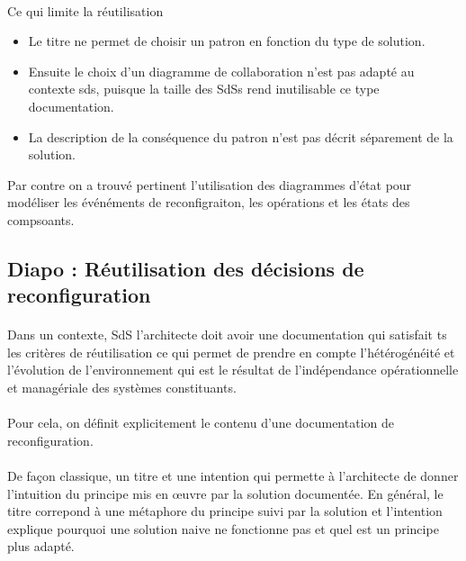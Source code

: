 \paragraph{}
Ce qui limite la réutilisation 
\begin{itemize}
\item Le titre ne permet de choisir un patron en fonction du type de
solution. 
\item Ensuite le choix d'un diagramme de collaboration n'est pas adapté au
contexte sds, puisque la taille des SdSs rend inutilisable ce type
documentation. 
\item La description de la conséquence du patron n'est pas décrit
séparement de la solution. 
\end{itemize}

Par contre on a trouvé pertinent l'utilisation des diagrammes d'état
pour modéliser les événéments de reconfigraiton, les opérations et les
états des compsoants.
 
\subsection{Diapo : Réutilisation des décisions de reconfiguration}

\paragraph{}
Dans un contexte, SdS l'architecte doit avoir une documentation qui
satisfait ts les critères de réutilisation ce qui
permet de prendre en compte l'hétérogénéité et l'évolution de l'environnement
qui est le résultat de l'indépendance opérationnelle et managériale
des systèmes constituants.  

\paragraph{}
Pour cela, on définit explicitement le contenu d'une documentation de
reconfiguration.  

\paragraph{}
De façon classique, un titre et une intention qui
permette à l'architecte de donner l'intuition du principe mis en
\oe{}uvre par la solution documentée. En général, le titre correpond à
une métaphore du principe suivi par la solution et l'intention
explique pourquoi une solution naive ne fonctionne pas et quel est un
principe plus adapté.   

